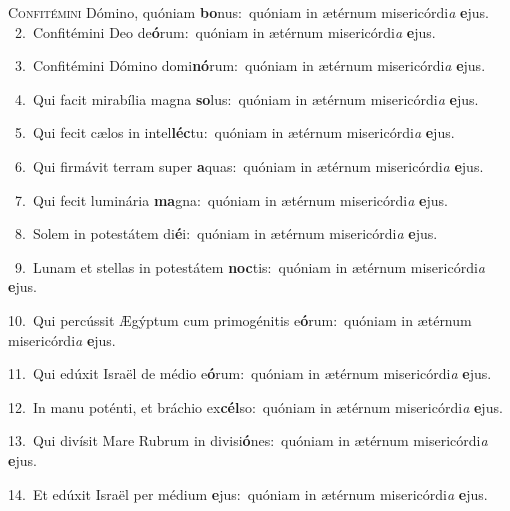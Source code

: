 \lettrine{\initial\textcolor{\initialcolor}{C}}{onfitémini} Dómino, quóniam \textbf{bo}\-nus:~\star quóniam in ætérnum misericórdi\textit{a} \textbf{e}\-jus.\\
{\numbfont\textcolor{\numbcolor}{~2.}}~Confitémini Deo de\-\textbf{ó}\-rum:~\star quóniam in ætérnum misericórdi\textit{a} \textbf{e}\-jus.\par
{\numbfont\textcolor{\numbcolor}{~3.}}~Confitémini Dómino domi\-\textbf{nó}\-rum:~\star quóniam in ætérnum misericórdi\textit{a} \textbf{e}\-jus.\par
{\numbfont\textcolor{\numbcolor}{~4.}}~Qui facit mirabília magna \textbf{so}\-lus:~\star quóniam in ætérnum misericórdi\textit{a} \textbf{e}\-jus.\par
{\numbfont\textcolor{\numbcolor}{~5.}}~Qui fecit cælos in intel\-\textbf{léc}\-tu:~\star quóniam in ætérnum misericórdi\textit{a} \textbf{e}\-jus.\par
{\numbfont\textcolor{\numbcolor}{~6.}}~Qui firmávit terram super \textbf{a}\-quas:~\star quóniam in ætérnum misericórdi\textit{a} \textbf{e}\-jus.\par
{\numbfont\textcolor{\numbcolor}{~7.}}~Qui fecit luminária \textbf{ma}\-gna:~\star quóniam in ætérnum misericórdi\textit{a} \textbf{e}\-jus.\par
{\numbfont\textcolor{\numbcolor}{~8.}}~Solem in potestátem di\-\textbf{é}\-i:~\star quóniam in ætérnum misericórdi\textit{a} \textbf{e}\-jus.\par
{\numbfont\textcolor{\numbcolor}{~9.}}~Lunam et stellas in potestátem \textbf{noc}\-tis:~\star quóniam in ætérnum misericórdi\textit{a} \textbf{e}\-jus.\par
{\numbfont\textcolor{\numbcolor}{10.}}~Qui percússit Ægýptum cum primogénitis e\-\textbf{ó}\-rum:~\star quóniam in ætérnum misericórdi\textit{a} \textbf{e}\-jus.\par
{\numbfont\textcolor{\numbcolor}{11.}}~Qui edúxit Israël de médio e\-\textbf{ó}\-rum:~\star quóniam in ætérnum misericórdi\textit{a} \textbf{e}\-jus.\par
{\numbfont\textcolor{\numbcolor}{12.}}~In manu poténti, et bráchio ex\-\textbf{cél}\-so:~\star quóniam in ætérnum misericórdi\textit{a} \textbf{e}\-jus.\par
{\numbfont\textcolor{\numbcolor}{13.}}~Qui divísit Mare Rubrum in divisi\-\textbf{ó}\-nes:~\star quóniam in ætérnum misericórdi\textit{a} \textbf{e}\-jus.\par
{\numbfont\textcolor{\numbcolor}{14.}}~Et edúxit Israël per médium \textbf{e}\-jus:~\star quóniam in ætérnum misericórdi\textit{a} \textbf{e}\-jus.\par
